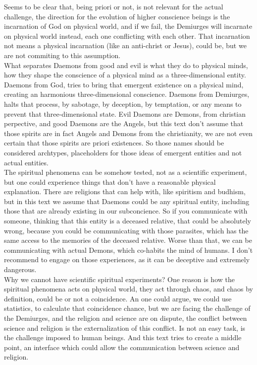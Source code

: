 \documentclass[12pt,a4paper]{article}
\begin{document}
Seems to be clear that, being priori or not, is not relevant for the actual challenge, the direction for the evolution of higher conscience beings is the incarnation of God on physical world, and if we fail, the Demiurges will incarnate on physical world instead, each one conflicting with each other. That incarnation not means a physical incarnation (like an anti-christ or Jesus), could be, but we are not commiting to this assumption.\\

What separates Daemons from good and evil is what they do to physical minds, how they shape the conscience of a physical mind as a three-dimensional entity. Daemons from God, tries to bring that emergent existence on a physical mind, creating an harmonious three-dimensional conscience. Daemons from Demiurges, halts that process, by sabotage, by deception, by temptation, or any means to prevent that three-dimensional state. Evil Daemons are Demons, from christian perpective, and good Daemons are the Angels, but this text don't assume that those spirits are in fact Angels and Demons from the christianity, we are not even certain that those spirits are priori existences. So those names should be considered archtypes, placeholders for those ideas of emergent entities and not actual entities.\\

The spiritual phenomena can be somehow tested, not as a scientific experiment, but one could experience things that don't have a reasonable physical explanation. There are religions that can help with, like spiritism and budhism, but in this text we assume that Daemons could be any spiritual entity, including those that are already existing in our subconcience. So if you communicate with someone, thinking that this entity is a deceased relative, that could be absolutely wrong, because you could be communicating with those parasites, which has the same access to the memories of the deceased relative. Worse than that, we can be communicating with actual Demons, which co-habits the mind of humans. I don't recommend to engage on those experiences, as it can be deceptive and extremely dangerous.\\

Why we cannot have scientific spiritual experiments? One reason is how the spiritual phenomena acts on physical world, they act through chaos, and chaos by definition, could be or not a coincidence. An one could argue, we could use statistics, to calculate that coincidence chance, but we are facing the challenge of the Demiurges, and the religion and science are on dispute, the conflict between science and religion is the externalization of this conflict. Is not an easy task, is the challenge imposed to human beings. And this text tries to create a middle point, an interface which could allow the communication between science and religion.
\end{document}
